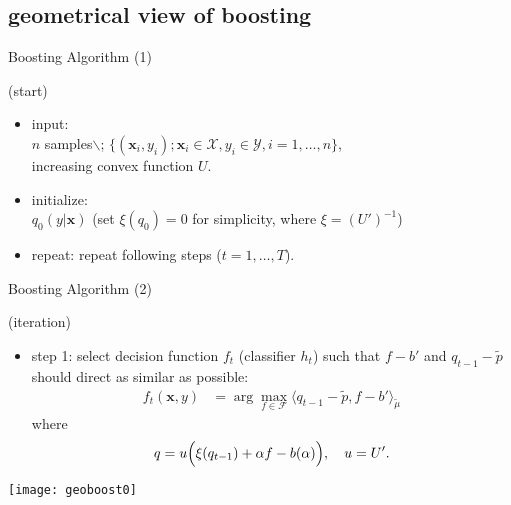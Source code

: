\documentclass[fleqn,aspectratio=1610]{beamer}
\begin{document}
\subsection{geometrical view of boosting}
\label{sec:orgff15e79}
\begin{frame}[label={sec:org6d0b304}]{Boosting Algorithm (1)}
\begin{block}{(start)}
\begin{itemize}
\item \alert{input:}\\[0pt]
\(n\) samples$\backslash$;
\(\{(\boldsymbol{x}_i,y_i); \boldsymbol{x}_i\in\mathcal{X},y_i\in\mathcal{Y}, i=1,\dots,n\}\),\\[0pt]
increasing convex function \(U\).
\item \alert{initialize:}\\[0pt]
\(q_0(y|\boldsymbol{x})\)
(set \(\xi(q_0)=0\) for simplicity, where \(\xi=(U')^{-1}\))
\item \alert{repeat:}
repeat following steps (\(t=1,\dots,T\)).
\end{itemize}
\end{block}
\end{frame}

\begin{frame}[label={sec:org0d6ce77}]{Boosting Algorithm (2)}
\begin{block}{(iteration)}
\begin{itemize}
\item \alert{step 1:}
select decision function \(f_t\) (classifier \(h_t\))
such that 
\(f-b'\) and \(q_{t-1}-\tilde{p}\)
should direct as similar as possible:
\begin{align}
  f_t(\boldsymbol{x},y)
  &=\arg\max_{f\in\mathcal{F}}
    \langle q_{t-1}-\tilde{p},f-b'\rangle_{\tilde{\mu}}
\end{align}
where
\begin{equation}
  q=u\Bigl(\xi(q_{t-1})+\alpha f-b(\alpha)\Bigr),\quad u=U'.
\end{equation}
\end{itemize}
\end{block}
\end{frame}

\begin{frame}[label={sec:org0b6ba94}]{}
\begin{center}
\texttt{[image: geoboost0]}
\end{center}
\end{frame}
\end{document}
